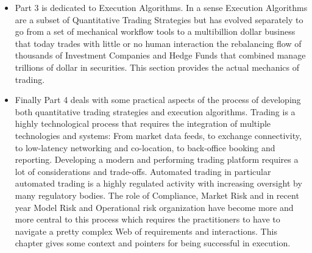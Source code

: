 \begin{itemize}
\item Part 3 is dedicated to Execution Algorithms. In a sense Execution Algorithms are a subset of Quantitative Trading Strategies but has evolved separately to go from a set of mechanical workflow tools to a multibillion dollar business that today trades with little or no human interaction the rebalancing flow of thousands of Investment Companies and Hedge Funds that combined manage trillions of dollar in securities. This section provides the actual mechanics of trading. 

\item Finally Part 4 deals with some practical aspects of the process of developing both quantitative trading strategies and execution algorithms. Trading is a highly technological process that requires the integration of multiple technologies and systems: From market data feeds, to exchange connectivity, to low-latency networking and co-location, to back-office booking and reporting. Developing a modern and performing trading platform requires a lot of considerations and trade-offs. Automated trading in particular automated trading is a highly regulated activity with increasing oversight by many regulatory bodies. The role of Compliance, Market Risk and in recent year Model Risk and Operational risk organization have become more and more central to this process which requires the practitioners to have to navigate a pretty complex Web of requirements and interactions. This chapter gives some context and pointers for being successful in execution.
\end{itemize}












